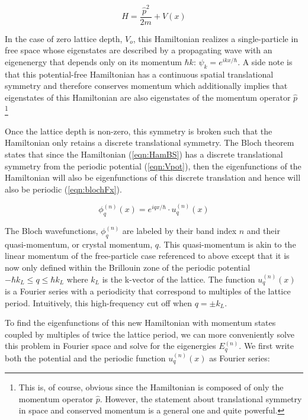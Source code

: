 \begin{equation}
\label{eqn:HamBS}
H=\frac{\hat{p}^2}{2m}+V(x)
\end{equation}

In the case of zero lattice depth, $V_o$, this Hamiltonian realizes a single-particle in free space whose eigenstates are described by a propagating wave with an eigenenergy that depends only on its momentum $\hbar k$: $\psi_k = e^{i k x/\hbar}$. A side note is that this potential-free Hamiltonian has a continuous spatial translational symmetry and therefore conserves momentum which additionally implies that eigenstates of this Hamiltonian are also eigenstates of the momentum operator $\hat{p}$ \footnote{This is, of course, obvious since the Hamiltonian is composed of only the momentum operator $\hat{p}$. However, the statement about translational symmetry in space and conserved  momentum is a general one and quite powerful.}

Once the lattice depth is non-zero, this symmetry is broken such that the Hamiltonian only retains a discrete translational symmetry. The Bloch theorem states that since the Hamiltonian (\ref{eqn:HamBS}) has a discrete translational symmetry from the periodic potential (\ref{eqn:Vpot}), then the eigenfunctions of the Hamiltonian will also be eigenfunctions of this discrete translation and hence will also be periodic (\ref{eqn:blochFx}).

\begin{equation}
\label{eqn:blochFx}
\phi_q^{(n)} (x) =  e^{i q x/\hbar} \cdot u_q^{(n)}(x)
\end{equation}

The Bloch wavefunctions, $\phi_q^{(n)}$ are labeled by their band index $n$ and their quasi-momentum, or crystal momentum, $q$. This quasi-momentum is akin to the linear momentum of the free-particle case referenced to above except that it is now only defined within the Brillouin zone of the periodic potential $- \hbar k_L \leq q \leq \hbar k_{L}$ where $k_L$ is the k-vector of the lattice. The function $u_q^{(n)}(x)$ is a Fourier series with a periodicity that correspond to multiples of the lattice period. Intuitively, this high-frequency cut off when $q=\pm k_L$.

To find the eigenfunctions of this new Hamiltonian with momentum states coupled by multiples of twice the lattice period, we can more conveniently solve this problem in Fourier space and solve for the eigenergies $E_q^{(n)}$. We first write both the potential and the periodic function $u_q^{(n)}(x)$ as Fourier series:

